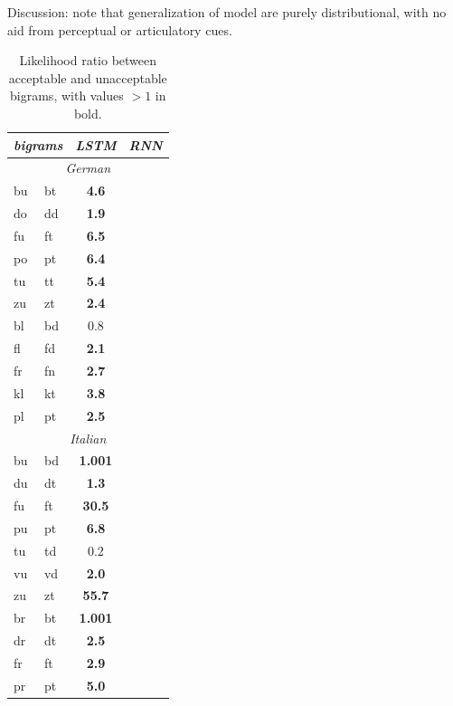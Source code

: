 Discussion: note that generalization of model are purely
distributional, with no aid from perceptual or articulatory cues.



\begin{table}[t]
  \begin{center}
    \begin{tabular}{ll|cc}
      \multicolumn{2}{c}{\emph{bigrams}}&\emph{LSTM}&\emph{RNN}\\
      \hline
      \multicolumn{4}{c}{\emph{German}}\\
      \hline
           bu &  bt &  \textbf{ 4.6} \\
           do &  dd &  \textbf{ 1.9} \\
           fu &  ft &  \textbf{ 6.5} \\
           po &  pt &  \textbf{ 6.4} \\
           tu &  tt &  \textbf{ 5.4} \\
           zu &  zt &  \textbf{ 2.4} \\ \hline
    bl &  bd & 0.8 \\
           fl &  fd &  \textbf{ 2.1} \\
           fr &  fn &  \textbf{ 2.7} \\
           kl &  kt &  \textbf{ 3.8} \\
           pl &  pt &  \textbf{ 2.5} \\

      \hline
      \multicolumn{4}{c}{\emph{Italian}}\\
      \hline
	    bu & bd & \textbf{ 1.001} \\
	    du & dt & \textbf{ 1.3} \\
	    fu & ft & \textbf{ 30.5} \\
	    pu & pt & \textbf{ 6.8} \\
	    tu & td &  0.2 \\
	    vu & vd & \textbf{ 2.0} \\
	    zu & zt & \textbf{ 55.7} \\ \hline
	    br & bt & \textbf{ 1.001} \\
	    dr & dt & \textbf{ 2.5} \\
	    fr & ft & \textbf{ 2.9} \\
	    pr & pt & \textbf{ 5.0} \\
    \end{tabular}
  \end{center}
  \caption{\label{tab:phonotactics-results} Likelihood ratio between acceptable and unacceptable bigrams,    with values $>1$ in bold.}
\end{table}


